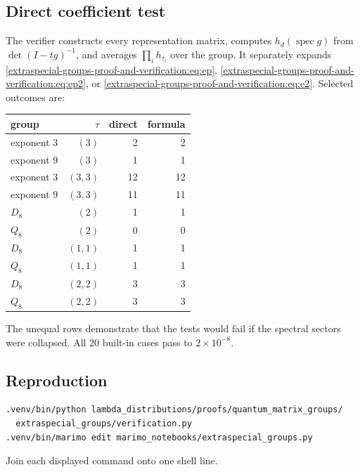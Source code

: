 \documentclass[10pt]{article}
\begin{document}
\subsection{Direct coefficient test}
The verifier constructs every representation matrix, computes
$h_d(\operatorname{spec}g)$ from $\det(I-tg)^{-1}$, and averages
$\prod_i h_{\tau_i}$ over the group.  It separately expands
\eqref{extraspecial-groups-proof-and-verification:eq:ep}, \eqref{extraspecial-groups-proof-and-verification:eq:ep2}, or \eqref{extraspecial-groups-proof-and-verification:eq:e2}.  Selected outcomes are:
\begin{center}
\begin{tabular}{@{}lrrr@{}}\toprule
group & $\tau$ & direct & formula\\\midrule
exponent $3$ & $(3)$&2&2\\
exponent $9$ & $(3)$&1&1\\
exponent $3$ & $(3,3)$&12&12\\
exponent $9$ & $(3,3)$&11&11\\
$D_8$ & $(2)$&1&1\\
$Q_8$ & $(2)$&0&0\\
$D_8$ & $(1,1)$&1&1\\
$Q_8$ & $(1,1)$&1&1\\
$D_8$ & $(2,2)$&3&3\\
$Q_8$ & $(2,2)$&3&3\\\bottomrule
\end{tabular}
\end{center}
The unequal rows demonstrate that the tests would fail if the spectral
sectors were collapsed.  All 20 built-in cases pass to $2\times10^{-8}$.

\subsection{Reproduction}
\begin{verbatim}
.venv/bin/python lambda_distributions/proofs/quantum_matrix_groups/
  extraspecial_groups/verification.py
.venv/bin/marimo edit marimo_notebooks/extraspecial_groups.py
\end{verbatim}
Join each displayed command onto one shell line.
\endgroup


\clearpage
\end{document}
